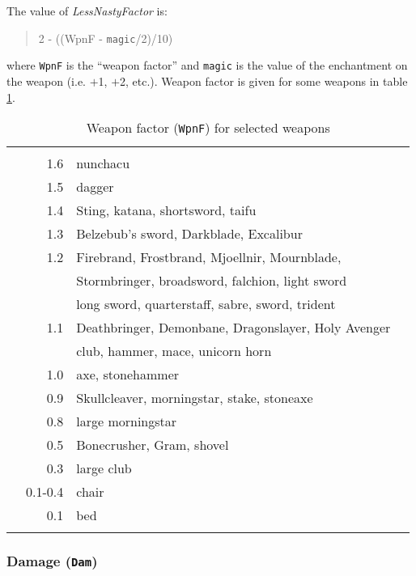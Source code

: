 The value of {\sl LessNastyFactor} is:
\begin{quote}
2 - ((WpnF - {\tt magic}/2)/10)
\end{quote}
where {\tt WpnF} is the ``weapon factor'' and {\tt magic} is the
value of the enchantment on the weapon (i.e. $+$1, $+$2, etc.).
Weapon factor is given for some weapons
in table \ref{tab:weap_factor}. \\

\begin{table}
\begin{center}
\caption{Weapon factor ({\tt WpnF}) for selected weapons}\label{tab:weap_factor}
\small
\vskip 12pt
\begin{tabular}{|crlc|} \hline
	& & & \\
       &  1.6 & nunchacu &  \\
       &  1.5 & dagger & \\
       &  1.4 & Sting, katana, shortsword, taifu & \\
       &  1.3 & Belzebub's sword, Darkblade, Excalibur & \\
       &  1.2 & Firebrand, Frostbrand, Mjoellnir, Mournblade, &  \\
       &      & Stormbringer, broadsword, falchion, light sword & \\
       &      & long sword, quarterstaff, sabre, sword, trident & \\
       &  1.1 & Deathbringer, Demonbane, Dragonslayer, Holy Avenger & \\
       &      & club, hammer, mace, unicorn horn & \\
       &  1.0 & axe, stonehammer & \\
       &  0.9 & Skullcleaver, morningstar, stake, stoneaxe & \\
       &  0.8 & large morningstar & \\
       &  0.5 & Bonecrusher, Gram, shovel & \\
       &  0.3 & large club &  \\
       &  0.1-0.4 & chair & \\
       &  0.1 & bed & \\
	& & & \\ \hline
\end{tabular}
\end{center}
\end{table}


\subsubsection{Damage ({\tt Dam})}

